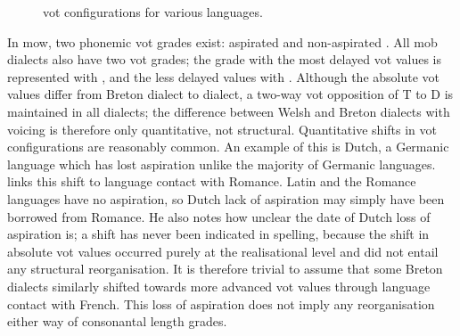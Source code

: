 \begin{figure}[h]
  \centering
  \caption{\Acrshort{vot} configurations for various languages.}
  \label{fig:votvarlang}
\end{figure}

In \gls{mow}, two phonemic \gls{vot} grades exist: aspirated  and non-aspirated . All \gls{mob} dialects also have two \gls{vot} grades; the grade with the most delayed \gls{vot} values is represented with , and the less delayed values with . Although the absolute \gls{vot} values differ from Breton dialect to dialect, a two-way \gls{vot} opposition of \gls{T} to \gls{D} is maintained in all dialects; the difference between Welsh and Breton dialects with voicing is therefore only quantitative, not structural. Quantitative shifts in \gls{vot} configurations are reasonably common. An example of this is Dutch, a Germanic language which has lost aspiration unlike the majority of Germanic languages. \Textcite[122--123]{Sch_Language14} links this shift to language contact with Romance. Latin and the Romance languages have no aspiration, so Dutch lack of aspiration may simply have been borrowed from Romance. He also notes how unclear the date of Dutch loss of aspiration is; a shift has never been indicated in spelling, because the shift in absolute \gls{vot} values occurred purely at the realisational level and did not entail any structural reorganisation. It is therefore trivial to assume that some Breton dialects similarly shifted towards more advanced \gls{vot} values through language contact with French. This loss of aspiration does not imply any reorganisation either way of consonantal length grades.


